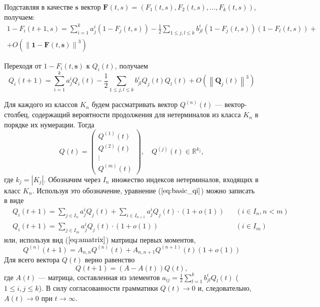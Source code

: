 \documentclass[12pt]{article}
\renewcommand{\leq}{\leqslant}
\begin{document}
{Подставляя в качестве $\textbf{s}$ вектор $\textbf{F}(t, s) = (F_1(t, s), F_2(t, s), \ldots, F_k(t, s))$, получаем:
\begin{multline}
\label{eq:basic_fi}
	1 - F_i(t + 1, s) = \sum_{i = 1}^k a^i_j (1 - F_j(t,s)) - \frac{1}{2} \sum_{1 \leq j,l \leq k} b^i_{jl} (1 - F_j(t,s)) (1 - F_l(t,s)) + \\
	+ O\left( \left\| \mathbf{1} - \mathbf{F}(t, \mathbf{s}) \right\| ^3 \right)
\end{multline}

Переходя от $1 - F_i(t, \mathbf{s})$ к $Q_i(t)$, получаем
\begin{equation}
\label{eq:basic_qi}
	Q_i(t+1) = \sum_{i = 1}^k a^i_j Q_i(t) - \frac{1}{2} \sum_{1 \leq j,l \leq k} b^i_{jl} Q_j(t) Q_l(t) + O \left( \left\| \mathbf{Q}_j(t) \right\|^3 \right)
\end{equation}

Для каждого из классов $K_n$ будем рассматривать вектор $Q^{(n)}(t)$ --- вектор-столбец, содержащий вероятности продолжения для нетерминалов из класса $K_n$ в порядке их нумерации. Тогда
\begin{equation}
	Q(t) =
	\begin{pmatrix}
		Q^{(1)}(t) \\
		Q^{(2)}(t) \\
		\vdots \\
		Q^{(m)}(t)
	\end{pmatrix},
	\quad Q^{(j)}(t) \in \mathbb{R}^{k_j},
\end{equation}
где $k_j = \left| K_j \right|$. Обозначим через $I_n$ иножество индексов нетерминалов, входящих в класс $K_n$. Используя это обозначение, уравнение ($\ref{eq:basic_qi}$) можно записать в виде
\begin{align}
	&Q_i(t+1) = \sum_{j \in I_n} a^i_j Q_j(t) + \sum_{i \in I_{n+1}} a^i_j Q_j(t) \cdot (1 + o(1)) & &(i \in I_n, n < m) \\
	&Q_i(t+1) = \sum_{j \in I_m} a^i_j Q_j(t) \cdot (1 + o(1)) & &(i \in I_m)
\end{align}
или, используя вид ($\ref{eq:amatrix}$) матрицы первых моментов,
\begin{equation}
	Q^{(n)}(t+1) = A_{n,n} Q^{(n)}(t) + A_{n,n+1} Q^{(n+1)}(t) (1 + o(1))
\end{equation}
Для всего вектора $Q(t)$ верно равенство
\begin{equation}
\label{eq:q_t+1_from_q_t}
	Q(t+1) = (A - A(t)) Q(t),
\end{equation}
где $A(t)$ --- матрица, составленная из элементов $a_{ij} = \frac{1}{2} \sum_{l = 1}^k b^i_{jl} Q_l(t)$ ($1 \leq i,j \leq k$). В силу согласованности грамматики $Q(t) \rightarrow 0$ и, следовательно, $A(t) \rightarrow 0$ при $t \rightarrow \infty$.

}
\end{document}
